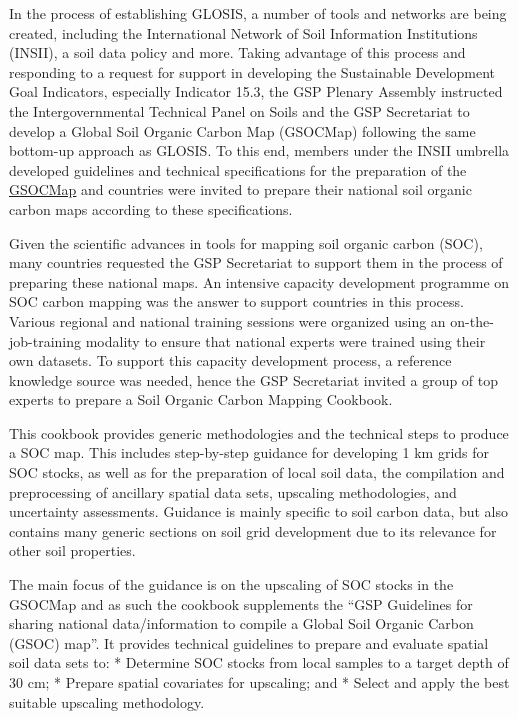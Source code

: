 \documentclass[]{book}
\theoremstyle{definition}
\theoremstyle{definition}
\theoremstyle{definition}
\theoremstyle{remark}
\begin{document}
In the process of establishing GLOSIS, a number of tools and networks
are being created, including the International Network of Soil
Information Institutions (INSII), a soil data policy and more. Taking
advantage of this process and responding to a request for support in
developing the Sustainable Development Goal Indicators, especially
Indicator 15.3, the GSP Plenary Assembly instructed the
Intergovernmental Technical Panel on Soils and the GSP Secretariat to
develop a Global Soil Organic Carbon Map (GSOCMap) following the same
bottom-up approach as GLOSIS. To this end, members under the INSII
umbrella developed guidelines and technical specifications for the
preparation of the \href{http://www.fao.org/3/a-bp164e.pdf}{GSOCMap} and
countries were invited to prepare their national soil organic carbon
maps according to these specifications.

Given the scientific advances in tools for mapping soil organic carbon
(SOC), many countries requested the GSP Secretariat to support them in
the process of preparing these national maps. An intensive capacity
development programme on SOC carbon mapping was the answer to support
countries in this process. Various regional and national training
sessions were organized using an on-the-job-training modality to ensure
that national experts were trained using their own datasets. To support
this capacity development process, a reference knowledge source was
needed, hence the GSP Secretariat invited a group of top experts to
prepare a Soil Organic Carbon Mapping Cookbook.

This cookbook provides generic methodologies and the technical steps to
produce a SOC map. This includes step-by-step guidance for developing 1
km grids for SOC stocks, as well as for the preparation of local soil
data, the compilation and preprocessing of ancillary spatial data sets,
upscaling methodologies, and uncertainty assessments. Guidance is mainly
specific to soil carbon data, but also contains many generic sections on
soil grid development due to its relevance for other soil properties.

The main focus of the guidance is on the upscaling of SOC stocks in the
GSOCMap and as such the cookbook supplements the ``GSP Guidelines for
sharing national data/information to compile a Global Soil Organic
Carbon (GSOC) map''. It provides technical guidelines to prepare and
evaluate spatial soil data sets to: * Determine SOC stocks from local
samples to a target depth of 30 cm; * Prepare spatial covariates for
upscaling; and * Select and apply the best suitable upscaling
methodology.
\end{document}
